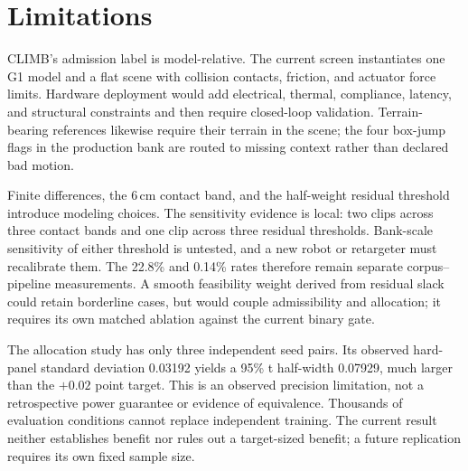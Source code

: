 \documentclass[letterpaper,10pt,conference]{ieeeconf}
\newcommand{\method}{CLIMB}
\begin{document}
\section{Limitations}

\method{}'s admission label is model-relative. The current screen instantiates one G1 model and a
flat scene with collision contacts, friction, and actuator force limits. Hardware deployment would
add electrical, thermal, compliance, latency, and structural constraints and then require
closed-loop validation. Terrain-bearing references likewise require their terrain in the scene;
the four box-jump flags in the production bank are routed to missing context rather than declared
bad motion.

Finite differences, the 6\,cm contact band, and the half-weight residual threshold introduce
modeling choices. The sensitivity evidence is local: two clips across three contact bands and one
clip across three residual thresholds. Bank-scale sensitivity of either threshold is untested,
and a new robot or retargeter must recalibrate them. The 22.8\% and 0.14\% rates therefore remain separate
corpus--pipeline measurements. A smooth feasibility weight derived from residual slack could
retain borderline cases, but would couple admissibility and allocation; it requires its own
matched ablation against the current binary gate.

The allocation study has only three independent seed pairs. Its observed hard-panel
standard deviation 0.03192 yields a 95\% t half-width 0.07929, much larger than the
$+0.02$ point target. This is an observed precision limitation, not a retrospective
power guarantee or evidence of equivalence. Thousands of evaluation conditions cannot
replace independent training. The current result neither establishes benefit nor rules
out a target-sized benefit; a future replication requires its own fixed sample size.
\end{document}
